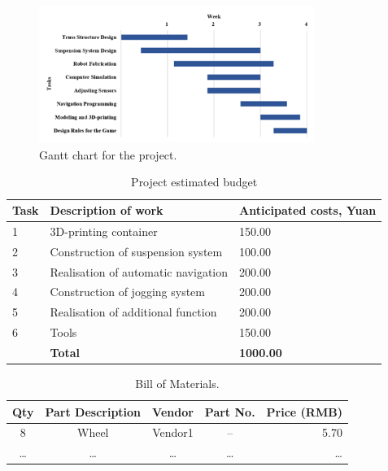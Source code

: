 \documentclass[10pt]{article}
\begin{document}
  \begin{figure}[!ht]
    \centering
    \includegraphics[width=0.8\textwidth]{figures/gantt_chart.png}
    \caption{Gantt chart for the project.}
    \label{fig:gantt_chart}
  \end{figure}

  \begin{table}[h]
    \centering
    \caption{Project estimated budget}
    \begin{tabular}{p{} p{} p{}}
      \toprule \textbf{Task} & \textbf{Description of work}        & \textbf{Anticipated costs, Yuan} \\
      \midrule 1             & 3D-printing container               & 150.00                           \\
      2                      & Construction of suspension system   & 100.00                           \\
      3                      & Realisation of automatic navigation & 200.00                           \\
      4                      & Construction of jogging system      & 200.00                           \\
      5                      & Realisation of additional function  & 200.00                           \\
      6                      & Tools                               & 150.00                           \\
      \midrule               & \textbf{Total}                      & \textbf{1000.00}                 \\
      \bottomrule
    \end{tabular}
    \label{tab:budget}
  \end{table}

  \begin{table}[!ht]
    \centering
    \caption{Bill of Materials.}
    \begin{tabular}{ccccr}
      \toprule Qty & Part Description & Vendor  & Part No. & Price (RMB) \\
      \midrule 8   & Wheel            & Vendor1 & --       & 5.70        \\
      \dots        & \dots            & \dots   & \dots    & \dots       \\
      \bottomrule
    \end{tabular}
    \label{tab:bill_of_materials}
  \end{table}
\end{document}
